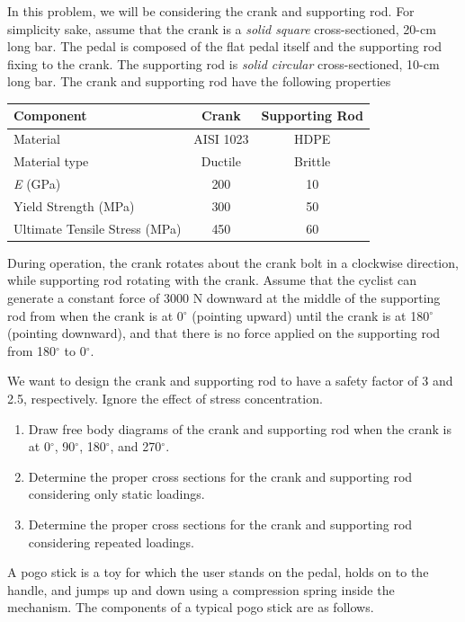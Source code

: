 \documentclass[
10pt,
a4paper,
openany,
svgnames,
]{book}
\newcommand{\exercise}{%
\item \label{lab:\arabic{chapter}-\arabic{exercisesi}}  %
}
\begin{document}
\begin{exercises}
  In this problem, we will be considering the crank and supporting rod. For simplicity sake, assume that the crank is a  \emph{solid square} cross-sectioned, 20-cm long bar. The pedal is composed of the flat pedal itself and the supporting rod fixing to the crank. The supporting rod is \emph{solid circular} cross-sectioned, 10-cm long bar.  The crank and supporting rod have the following properties
  
  \begin{center}
    \begin{tabular}{ l c c }
      \toprule
      Component	&	Crank	&	Supporting Rod \\
      \midrule
      Material	&	AISI 1023	&	HDPE	\\
      Material type & Ductile	&	Brittle \\
      \emph{E} (GPa)	&	200	&	10	\\
      Yield Strength (MPa)	&	300	&	 50	\\
      Ultimate Tensile Stress (MPa)	&	450	&	60	\\
      \bottomrule
    \end{tabular}
  \end{center}
  
  During operation, the crank rotates about the crank bolt in a clockwise direction, while supporting rod rotating with the crank. Assume that the cyclist can generate a constant force of 3000 N downward at the middle of the supporting rod from when the crank is at 0$^{\circ}$ (pointing upward) until the crank is at 180$^{\circ}$ (pointing downward), and that there is no force applied on the supporting rod from 180$^{\circ}$ to 0$^{\circ}$.
  
  We want to design the crank and supporting rod to have a safety factor of 3 and 2.5, respectively. Ignore the effect of stress concentration.
  
  \begin{enumerate}
  \item Draw free body diagrams of the crank and supporting rod when the crank is at 0$^{\circ}$, 90$^{\circ}$, 180$^{\circ}$, and 270$^{\circ}$.
  \item Determine the proper cross sections for the crank and supporting rod considering only static loadings.
  \item Determine the proper cross sections for the crank and supporting rod considering repeated loadings.
  \end{enumerate}

  \exercise A pogo stick is a toy for which the user stands on the pedal, holds on
  to the handle, and jumps up and down using a compression spring inside
  the mechanism. The components of a typical pogo stick are as follows.
  

\end{exercises}
\end{document}

